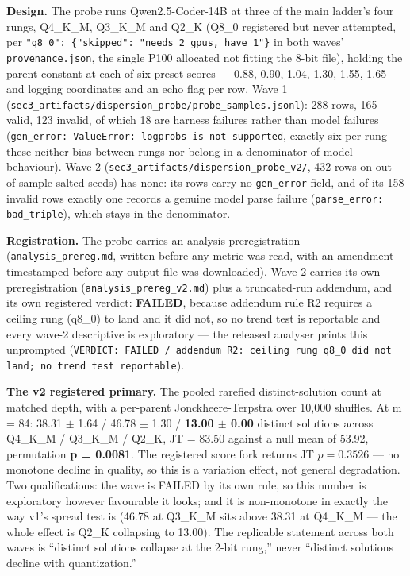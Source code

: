 \textbf{Design.} The probe runs Qwen2.5-Coder-14B at three of the main ladder's four rungs, Q4\_K\_M, Q3\_K\_M and Q2\_K (Q8\_0 registered but never attempted, per \texttt{"q8\_0": \{"skipped": "needs 2 gpus, have 1"\}} in both waves' \texttt{provenance.json}, the single P100 allocated not fitting the 8-bit file), holding the parent constant at each of six preset scores --- 0.88, 0.90, 1.04, 1.30, 1.55, 1.65 --- and logging coordinates and an echo flag per row. Wave 1 (\texttt{sec3\_\bk{}artifacts/\bk{}dispersion\_\bk{}probe/\bk{}probe\_\bk{}samples.jsonl}): 288 rows, 165 valid, 123 invalid, of which 18 are harness failures rather than model failures (\texttt{gen\_error: ValueError: logprobs is not supported}, exactly six per rung --- these neither bias between rungs nor belong in a denominator of model behaviour). Wave 2 (\texttt{sec3\_\bk{}artifacts/\bk{}dispersion\_\bk{}probe\_\bk{}v2/\bk{}}, 432 rows on out-of-sample salted seeds) has none: its rows carry no \texttt{gen\_error} field, and of its 158 invalid rows exactly one records a genuine model parse failure (\texttt{parse\_error: bad\_triple}), which stays in the denominator.

\textbf{Registration.} The probe carries an analysis preregistration (\texttt{analysis\_prereg.md}, written before any metric was read, with an amendment timestamped before any output file was downloaded). Wave 2 carries its own preregistration (\texttt{analysis\_prereg\_v2.md}) plus a truncated-run addendum, and its own registered verdict: \textbf{FAILED}, because addendum rule R2 requires a ceiling rung (q8\_0) to land and it did not, so no trend test is reportable and every wave-2 descriptive is exploratory --- the released analyser prints this unprompted (\texttt{VERDICT: FAILED /\bk{} addendum R2: ceiling rung q8\_\bk{}0 did not land; no trend test reportable}).

\textbf{The v2 registered primary.} The pooled rarefied distinct-solution count at matched depth, with a per-parent Jonckheere-Terpstra over 10,000 shuffles. At m = 84: 38.31 $\pm$ 1.64 / 46.78 $\pm$ 1.30 / \textbf{13.00 $\pm$ 0.00} distinct solutions across Q4\_K\_M / Q3\_K\_M / Q2\_K, JT = 83.50 against a null mean of 53.92, permutation \textbf{p = 0.0081}. The registered score fork returns JT $p = 0.3526$ --- no monotone decline in quality, so this is a variation effect, not general degradation. Two qualifications: the wave is FAILED by its own rule, so this number is exploratory however favourable it looks; and it is non-monotone in exactly the way v1's spread test is (46.78 at Q3\_K\_M sits above 38.31 at Q4\_K\_M --- the whole effect is Q2\_K collapsing to 13.00). The replicable statement across both waves is ``distinct solutions collapse at the 2-bit rung,'' never ``distinct solutions decline with quantization.''

